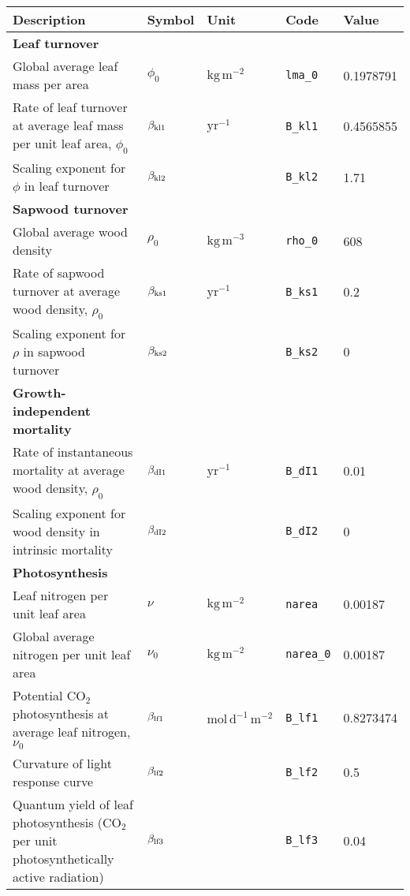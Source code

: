 \begin{tabular}{p{7cm}llll}
  \hline
Description & Symbol & Unit & Code & Value \\ 
  \hline
\textbf{Leaf turnover} &  &  &  &  \\ 
  Global average leaf mass per area & $\phi_0$ & $\mathrm{kg}\,\mathrm{m}^{-2}$ & \texttt{lma\_0} & 0.1978791 \\ 
  Rate of leaf turnover at average leaf mass per unit leaf area, $\phi_0$ & $\beta_{\rm kl1}$ & $\mathrm{yr}^{-1}$ & \texttt{B\_kl1} & 0.4565855 \\ 
  Scaling exponent for $\phi$ in leaf turnover & $\beta_{\rm kl2}$ &  & \texttt{B\_kl2} & 1.71 \\ 
  \textbf{Sapwood turnover} &  &  &  &  \\ 
  Global average wood density & $\rho_0$ & $\mathrm{kg}\,\mathrm{m}^{-3}$ & \texttt{rho\_0} & 608 \\ 
  Rate of sapwood turnover at average wood density, $\rho_0$ & $\beta_{\rm ks1}$ & $\mathrm{yr}^{-1}$ & \texttt{B\_ks1} & 0.2 \\ 
  Scaling exponent for $\rho$ in sapwood turnover & $\beta_{\rm ks2}$ &  & \texttt{B\_ks2} & 0 \\ 
  \textbf{Growth-independent mortality} &  &  &  &  \\ 
  Rate of instantaneous mortality at average wood density, $\rho_0$ & $\beta_{\rm dI1}$ & $\mathrm{yr}^{-1}$ & \texttt{B\_dI1} & 0.01 \\ 
  Scaling exponent for wood density in intrinsic mortality & $\beta_{\rm dI2}$ &  & \texttt{B\_dI2} & 0 \\ 
  \textbf{Photosynthesis} &  &  &  &  \\ 
  Leaf nitrogen per unit leaf area & $\nu$ & $\mathrm{kg}\,\mathrm{m}^{-2}$ & \texttt{narea} & 0.00187 \\ 
  Global average nitrogen per unit leaf area & $\nu_0$ & $\mathrm{kg}\,\mathrm{m}^{-2}$ & \texttt{narea\_0} & 0.00187 \\ 
  Potential CO$_2$ photosynthesis at average leaf nitrogen, $\nu_0$ & $\beta_{\rm lf1}$ & $\mathrm{mol}\,\mathrm{d}^{-1}\,\mathrm{m}^{-2}$ & \texttt{B\_lf1} & 0.8273474 \\ 
  Curvature of light response curve & $\beta_{\rm lf2}$ &  & \texttt{B\_lf2} & 0.5 \\ 
  Quantum yield of leaf photosynthesis (CO$_2$ per unit photosynthetically active radiation) & $\beta_{\rm lf3}$ &  & \texttt{B\_lf3} & 0.04 \\ 

\end{tabular}

